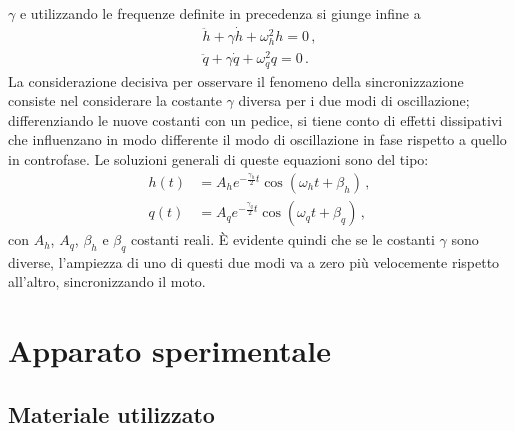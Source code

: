 \documentclass[11pt, a4paper, twoside, italian]{article}
\begin{document}
$\gamma$ e utilizzando le frequenze definite in precedenza si giunge infine a
\begin{equation*}
  \begin{split}
  \ddot h + \gamma \dot h + \omega_h^2 h  = 0 \, ,\\
  \ddot q +\gamma \dot q + \omega_q^2 q = 0 \, .
  \end{split}
\end{equation*}
La considerazione decisiva per osservare il fenomeno della sincronizzazione 
consiste nel considerare la costante $\gamma$ diversa per i due modi di oscillazione;
differenziando le nuove costanti con un pedice, si tiene conto di 
effetti dissipativi che influenzano in modo differente il modo di oscillazione
in fase rispetto a quello in controfase.
Le soluzioni generali di queste equazioni sono del tipo:
\begin{align}
    h(t) &= A_h e^{- \frac{\gamma_h}{2} t} \cos(\omega_h t + \beta_h) \label{equazionefinaleh} \, , \\
    q(t) &= A_q e^{- \frac{\gamma_q}{2} t} \cos(\omega_q t + \beta_q) \label{equazionefinaleq} \, ,
\end{align}
con $A_h$, $A_q$, $\beta_h$ e $\beta_q$ costanti reali.
È evidente quindi che se le costanti $\gamma$ sono diverse, l'ampiezza di uno di questi due modi va a zero più velocemente rispetto 
all'altro, sincronizzando il moto.

\section{Apparato sperimentale}
\subsection{Materiale utilizzato}
\end{document}
